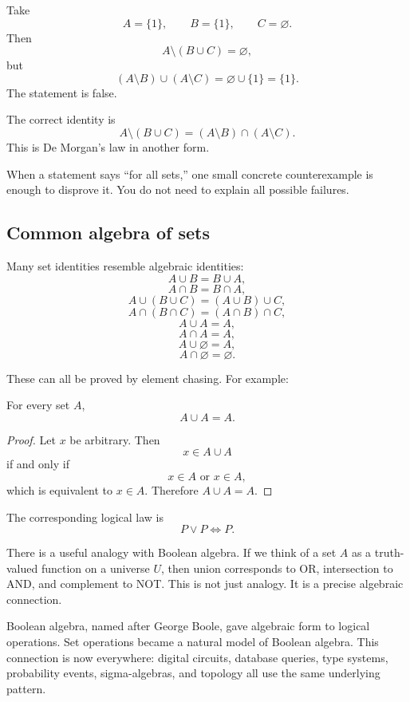 Take
\[
A=\{1\},\qquad B=\{1\},\qquad C=\varnothing.
\]
Then
\[
A\setminus(B\cup C)=\varnothing,
\]
but
\[
(A\setminus B)\cup(A\setminus C)=\varnothing\cup\{1\}=\{1\}.
\]
The statement is false.

The correct identity is
\[
A\setminus(B\cup C)=(A\setminus B)\cap(A\setminus C).
\]
This is De Morgan's law in another form.

\begin{trapbox}
When a statement says ``for all sets,'' one small concrete counterexample is enough to disprove it. You do not need to explain all possible failures.
\end{trapbox}

\subsection{Common algebra of sets}

Many set identities resemble algebraic identities:
\[
A\cup B=B\cup A,
\]
\[
A\cap B=B\cap A,
\]
\[
A\cup(B\cup C)=(A\cup B)\cup C,
\]
\[
A\cap(B\cap C)=(A\cap B)\cap C,
\]
\[
A\cup A=A,
\]
\[
A\cap A=A,
\]
\[
A\cup\varnothing=A,
\]
\[
A\cap\varnothing=\varnothing.
\]

These can all be proved by element chasing. For example:

\begin{theorem}
For every set $A$,
\[
A\cup A=A.
\]
\end{theorem}

\begin{proof}
Let $x$ be arbitrary. Then
\[
x\in A\cup A
\]
if and only if
\[
x\in A\text{ or }x\in A,
\]
which is equivalent to $x\in A$. Therefore $A\cup A=A$.
\end{proof}

The corresponding logical law is
\[
P\lor P\Longleftrightarrow P.
\]

There is a useful analogy with Boolean algebra. If we think of a set $A$ as a truth-valued function on a universe $U$, then union corresponds to OR, intersection to AND, and complement to NOT. This is not just analogy. It is a precise algebraic connection.

\begin{historybox}
Boolean algebra, named after George Boole, gave algebraic form to logical operations. Set operations became a natural model of Boolean algebra. This connection is now everywhere: digital circuits, database queries, type systems, probability events, sigma-algebras, and topology all use the same underlying pattern.
\end{historybox}

